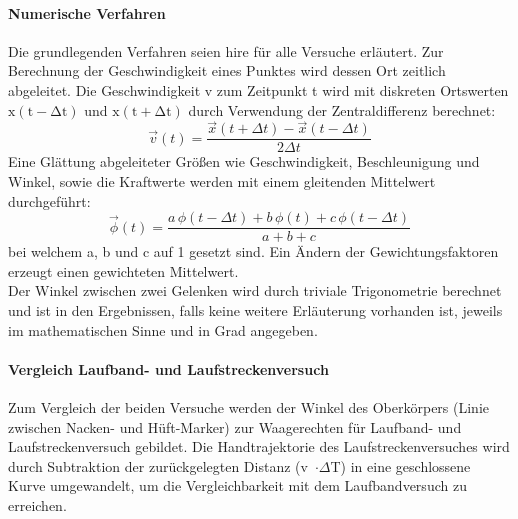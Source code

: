 \paragraph{Numerische Verfahren}
Die grundlegenden Verfahren seien hire für alle Versuche erläutert. Zur Berechnung der Geschwindigkeit eines Punktes wird dessen Ort zeitlich abgeleitet. Die Geschwindigkeit v zum Zeitpunkt t wird mit diskreten Ortswerten $\mathrm{x(t - \Delta{t})}$ und $\mathrm{x(t + \Delta{t})}$ durch Verwendung der Zentraldifferenz berechnet:
\begin{equation}
\vec{v}(t) = \frac{\vec{x}(t + \Delta{t}) - \vec{x}(t - \Delta{t})}{2\Delta{t}}
\end{equation}
Eine Glättung abgeleiteter Größen wie Geschwindigkeit, Beschleunigung und Winkel, sowie die Kraftwerte werden mit einem gleitenden Mittelwert durchgeführt:
\begin{equation}
\vec{\phi}(t) = \frac{a\,\phi(t - \Delta{t}) + b\,\phi(t) + c\,\phi(t - \Delta{t})}{a + b + c}
\end{equation}
bei welchem a, b und c auf 1 gesetzt sind. Ein Ändern der Gewichtungsfaktoren erzeugt einen gewichteten Mittelwert.\\
Der Winkel zwischen zwei Gelenken wird durch triviale Trigonometrie berechnet und ist in den Ergebnissen, falls keine weitere Erläuterung vorhanden ist, jeweils im mathematischen Sinne und in Grad angegeben. 

\paragraph{Vergleich Laufband- und Laufstreckenversuch}
Zum Vergleich der beiden Versuche werden der Winkel des Oberkörpers (Linie zwischen Nacken- und Hüft-Marker) zur Waagerechten für Laufband- und Laufstreckenversuch gebildet. Die Handtrajektorie des Laufstreckenversuches wird durch Subtraktion der zurückgelegten Distanz (v~$\cdot\Delta$T) in eine geschlossene Kurve umgewandelt, um die Vergleichbarkeit mit dem Laufbandversuch zu erreichen.

